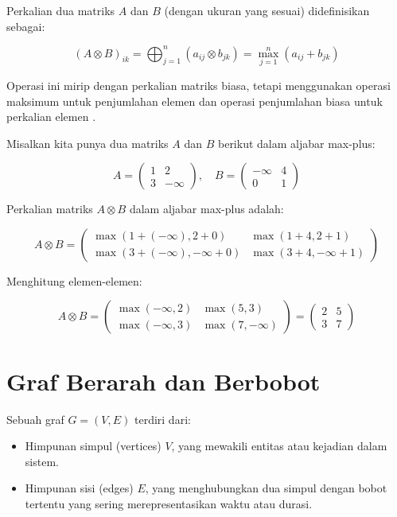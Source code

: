 \documentclass{file/TA-ITS}
\theoremstyle{definition}
\theoremstyle{definition}
\theoremstyle{plain}
\begin{document}
Perkalian dua matriks \( A \) dan \( B \) (dengan ukuran yang sesuai) didefinisikan sebagai:

\[
(A \otimes B)_{ik} = \bigoplus_{j=1}^n (a_{ij} \otimes b_{jk}) = \max_{j=1}^n (a_{ij} + b_{jk})
\]

Operasi ini mirip dengan perkalian matriks biasa, tetapi menggunakan operasi maksimum untuk penjumlahan elemen dan operasi penjumlahan biasa untuk perkalian elemen \cite{butkovic2010maxplus}.

Misalkan kita punya dua matriks \( A \) dan \( B \) berikut dalam aljabar max-plus:

\[
A = \begin{pmatrix} 1 & 2 \\ 3 & -\infty \end{pmatrix}, \quad B = \begin{pmatrix} -\infty & 4 \\ 0 & 1 \end{pmatrix}
\]

Perkalian matriks \( A \otimes B \) dalam aljabar max-plus adalah:

\[
A \otimes B = \begin{pmatrix} \max(1 + (-\infty), 2 + 0) & \max(1 + 4, 2 + 1) \\ \max(3 + (-\infty), -\infty + 0) & \max(3 + 4, -\infty + 1) \end{pmatrix}
\]

Menghitung elemen-elemen:

\[
A \otimes B = \begin{pmatrix} \max(-\infty, 2) & \max(5, 3) \\ \max(-\infty, 3) & \max(7, -\infty) \end{pmatrix}
= \begin{pmatrix} 2 & 5 \\ 3 & 7 \end{pmatrix}
\]

\section{Graf Berarah dan Berbobot}

Sebuah graf \( G = (V, E) \) terdiri dari:
\begin{itemize}
    \item Himpunan simpul (vertices) \( V \), yang mewakili entitas atau kejadian dalam sistem.
    \item Himpunan sisi (edges) \( E \), yang menghubungkan dua simpul dengan bobot tertentu yang sering merepresentasikan waktu atau durasi.
\end{itemize}
\end{document}
